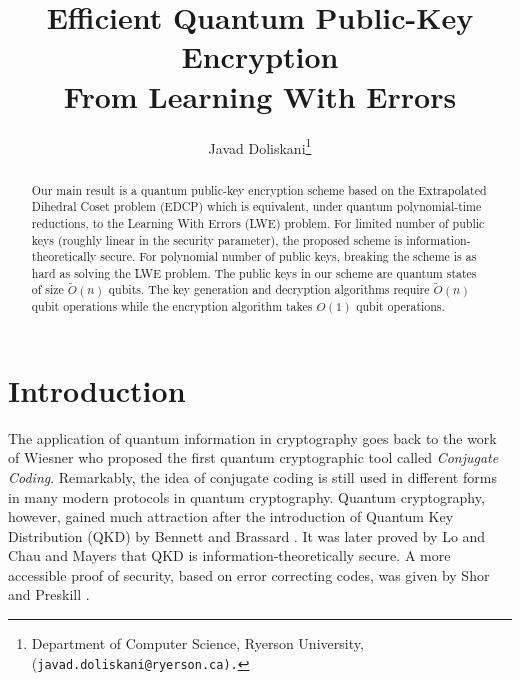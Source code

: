 \documentclass[11pt]{article}
\title{Efficient Quantum Public-Key Encryption \\ From Learning With Errors}
\author{
	Javad Doliskani\thanks{Department of Computer Science, Ryerson University,
	(\tt{javad.doliskani@ryerson.ca}).}
}
\date{}
\theoremstyle{plain}
\theoremstyle{definition}
\newcommand{\tildO}{\tilde{O}}
\begin{document}
\maketitle

\begin{abstract}
    Our main result is a quantum public-key encryption scheme based on the Extrapolated Dihedral Coset problem (EDCP) which is equivalent, under quantum polynomial-time reductions, to the Learning With Errors (LWE) problem. For limited number of public keys (roughly linear in the security parameter), the proposed scheme is information-theoretically secure. For polynomial number of public keys, breaking the scheme is as hard as solving the LWE problem. The public keys in our scheme are quantum states of size $\tildO(n)$ qubits. The key generation and decryption algorithms require $\tildO(n)$ qubit operations while the encryption algorithm takes $O(1)$ qubit operations.
\end{abstract}

\newpage


\section{Introduction}
\label{sec:intro}

The application of quantum information in cryptography goes back to the work of Wiesner \cite{wiesner1983conjugate} who proposed the first quantum cryptographic tool called \textit{Conjugate Coding}. Remarkably, the idea of conjugate coding is still used in different forms in many modern protocols in quantum cryptography. Quantum cryptography, however, gained much attraction after the introduction of Quantum Key Distribution (QKD) by Bennett and Brassard \cite{bennett1983quantum, bennett1984quantum}. It was later proved by Lo and Chau \cite{lo1999unconditional} and Mayers \cite{mayers2001unconditional} that QKD is information-theoretically secure. A more accessible proof of security, based on error correcting codes, was  given by Shor and Preskill \cite{shor2000simple}. 
\end{document}
